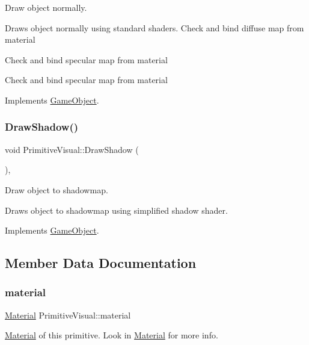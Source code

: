 Draw object normally. 

Draws object normally using standard shaders. Check and bind diffuse map from material

Check and bind specular map from material

Check and bind specular map from material 

Implements \mbox{\hyperlink{class_game_object_a29a665f46fda87982825bc5c0ca6a888}{Game\+Object}}.

\mbox{\label{class_primitive_visual_a67915de082572ca4f6467c1402587024}} 
\subsubsection{\texorpdfstring{DrawShadow()}{DrawShadow()}}
{\footnotesize\ttfamily void Primitive\+Visual\+::\+Draw\+Shadow (\begin{DoxyParamCaption}{ }\end{DoxyParamCaption})\hspace{0.3cm}{\ttfamily [override]}, {\ttfamily [virtual]}}



Draw object to shadowmap. 

Draws object to shadowmap using simplified shadow shader. 

Implements \mbox{\hyperlink{class_game_object_a78bf45c8ef3805247435583556087788}{Game\+Object}}.



\subsection{Member Data Documentation}
\mbox{\label{class_primitive_visual_a775945d5dc204a98315eda90d6482278}} 
\subsubsection{\texorpdfstring{material}{material}}
{\footnotesize\ttfamily \mbox{\hyperlink{struct_material}{Material}} Primitive\+Visual\+::material}



\mbox{\hyperlink{struct_material}{Material}} of this primitive. Look in \mbox{\hyperlink{struct_material}{Material}} for more info. 

